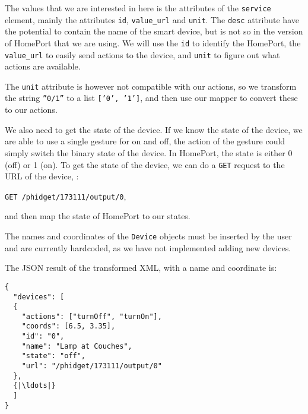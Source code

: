 The values that we are interested in here is the attributes of the \texttt{service} element, 
mainly the attributes \texttt{id}, \texttt{value\_url} and \texttt{unit}. 
The \texttt{desc} attribute have the potential to contain the name of the smart device, 
but is not so in the version of HomePort that we are using. 
We will use the \texttt{id} to identify the HomePort, 
the \texttt{value\_url} to easily send actions to the device, 
and \texttt{unit} to figure out what actions are available. 

The \texttt{unit} attribute is however not compatible with our actions, 
so we transform the string \texttt{''0/1''} to a list \texttt{['0', '1']}, 
and then use our mapper to convert these to our actions. 

We also need to get the state of the device. 
If we know the state of the device, 
we are able to use a single gesture for on and off,
\ie the action of the gesture could simply switch the binary state of the device. 
In HomePort, the state is either 0 (off) or 1 (on). 
To get the state of the device, 
we can do a \texttt{GET} request to the URL of the device, \eg:
\begin{center}
  \texttt{GET /phidget/173111/output/0},
\end{center}
and then map the state of HomePort to our states.

The names and coordinates of the \texttt{Device} objects must be inserted by the user and are currently hardcoded, 
as we have not implemented adding new devices. 

The JSON result of the transformed XML, with a name and coordinate is:

\begin{verbatim}
{
  "devices": [
  {
    "actions": ["turnOff", "turnOn"], 
    "coords": [6.5, 3.35], 
    "id": "0", 
    "name": "Lamp at Couches", 
    "state": "off", 
    "url": "/phidget/173111/output/0"
  }, 
  {|\ldots|}
  ]
}
\end{verbatim}
